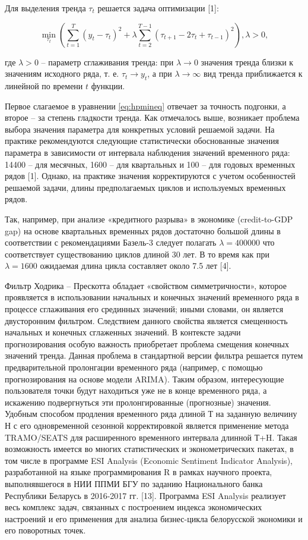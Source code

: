 \documentclass[a4paper,14pt]{extreport}
\begin{document}
	Для выделения тренда $\tau_t$ решается задача оптимизации [1]: 
	
	
	
	\begin{equation}	
	{
		\min_{ \tau_t }{
			( 
			\sum_{t=1}^{T} (y_t-\tau_t)^2 + 
			\lambda \sum_{t=2}^{T-1} (\tau_{t+1} - 2\tau_t + \tau_{t-1})^2
			)
		}, 
		\lambda > 0, \label{eq:hpmineq}
	}
	\end{equation}
	
	где $\lambda > 0$ – параметр сглаживания тренда: при $\lambda \rightarrow 0$ значения тренда близки к значениям исходного ряда, т. е. $\tau_t \rightarrow y_t$, а при $\lambda \rightarrow \infty$ вид тренда приближается к линейной по времени $t$ функции.
	
	Первое слагаемое в уравнении \ref{eq:hpmineq} отвечает за точность подгонки, а второе – за степень гладкости тренда. Как отмечалось выше, возникает проблема выбора значения параметра   для конкретных условий решаемой задачи. На практике рекомендуются следующие статистически обоснованные значения параметра   в зависимости от интервала наблюдения значений временного ряда: 14400 – для месячных, 1600 – для квартальных и 100 – для годовых временных рядов [1]. Однако, на практике значения   корректируются с учетом особенностей решаемой задачи, длины предполагаемых циклов и используемых временных рядов. 
	
	Так, например, при анализе «кредитного разрыва» в экономике (credit-to-GDP gap) на основе квартальных временных рядов достаточно большой длины в соответствии с рекомендациями Базель-3 следует полагать $\lambda = 400000$  что соответствует существованию циклов длиной 30 лет.  В то время как при $\lambda = 1600$ ожидаемая длина цикла составляет около 7.5 лет [4].
	
	Фильтр Ходрика – Прескотта обладает «свойством симметричности», которое проявляется в использовании начальных и конечных значений временного ряда в процессе сглаживания его срединных значений; иными словами, он является двусторонним фильтром. Следствием данного свойства является смещенность начальных и конечных сглаженных значений. В контексте задачи прогнозирования особую важность приобретает проблема смещения конечных значений тренда. Данная проблема в стандартной версии фильтра решается путем предварительной пролонгации временного ряда (например, с помощью прогнозирования на основе модели ARIMA). Таким образом, интересующие пользователя точки будут находиться уже не в конце временного ряда, а искажению подвергнуться эти пролонгированные (прогнозные) значения. Удобным способом продления временного ряда длиной Т на заданную величину Н с его одновременной сезонной корректировкой является применение метода TRAMO/SEATS для расширенного временного интервала длинной Т+H. Такая возможность имеется во многих статистических и эконометрических пакетах, в том числе в программе ESI Analysis (Economic Sentiment Indicator Analysis), разработанной на языке программирования R в рамках научного проекта, выполнявшегося в НИИ ППМИ БГУ по заданию Национального банка Республики Беларусь в 2016-2017 гг. [13]. Программа ESI Analysis реализует весь комплекс задач, связанных с построением индекса экономических настроений и его применения для анализа бизнес-цикла белорусской экономики и его поворотных точек.  
	
\end{document}
